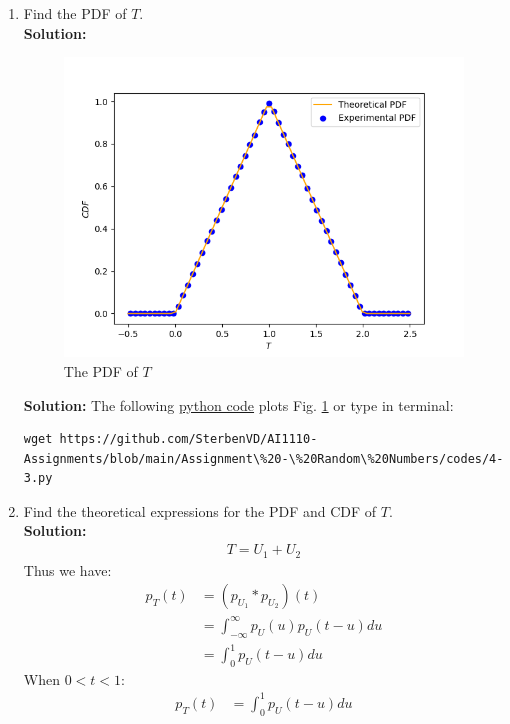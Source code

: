 \documentclass[journal,12pt,twocolumn]{IEEEtran}
\numberwithin{equation}{section}
\renewcommand\thesection{\arabic{section}}
\providecommand{\gitlink}[2]{{\color{blue}\href{https://github.com/SterbenVD/AI1110-Assignments/blob/main/Assignment\%20-\%20Random\%20Numbers/#1}{#2}}}
\newcommand{\solution}{\noindent \textbf{Solution: }}
\begin{document}
\begin{enumerate}[label=\thesection.\arabic*
        ,ref=\thesection.\theenumi]
    \item Find the PDF of $T$.
          \\
          \solution\begin{figure}[H]
              \centering
              \includegraphics[width = \columnwidth]{../figs/4_pdf}
              \caption{The PDF of $T$}
              \label{fig:4_pdf}
          \end{figure}
          \solution The following \gitlink{codes/4-3.py}{python code} plots Fig. \ref{fig:4_pdf} or type in terminal:
          \begin{lstlisting}
wget https://github.com/SterbenVD/AI1110-Assignments/blob/main/Assignment\%20-\%20Random\%20Numbers/codes/4-3.py
      \end{lstlisting}
    \item Find the theoretical expressions for the PDF and CDF of $T$. \\
          \solution
          \begin{align}
              T = U_1 + U_2
          \end{align}
          Thus we have:
          \begin{align}
              p_T(t) & = (p_{U_1} * p_{U_2})(t)
              \\
                     & = \int _{-\infty} ^{\infty} p_U(u) p_U(t-u) du
              \\
                     & = \int _0 ^1 p_U(t-u) du
          \end{align}
          When $0 < t < 1$:
          \begin{align}
              p_T(t) & = \int _0 ^1 p_U(t-u) du

\end{align}
\end{enumerate}
\end{document}
